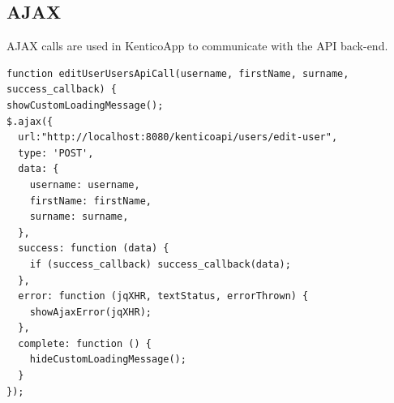 \subsection{AJAX}
AJAX calls are used in KenticoApp  to communicate with the API back-end.
\lstset{style=sharpc, numbers=left}
\begin{lstlisting}
function editUserUsersApiCall(username, firstName, surname, success_callback) {
showCustomLoadingMessage();
$.ajax({
  url:"http://localhost:8080/kenticoapi/users/edit-user",
  type: 'POST',
  data: {
    username: username,
    firstName: firstName,
    surname: surname,
  },
  success: function (data) {
    if (success_callback) success_callback(data);
  },
  error: function (jqXHR, textStatus, errorThrown) {
    showAjaxError(jqXHR);
  },
  complete: function () {
    hideCustomLoadingMessage();
  }
});
\end{lstlisting}
